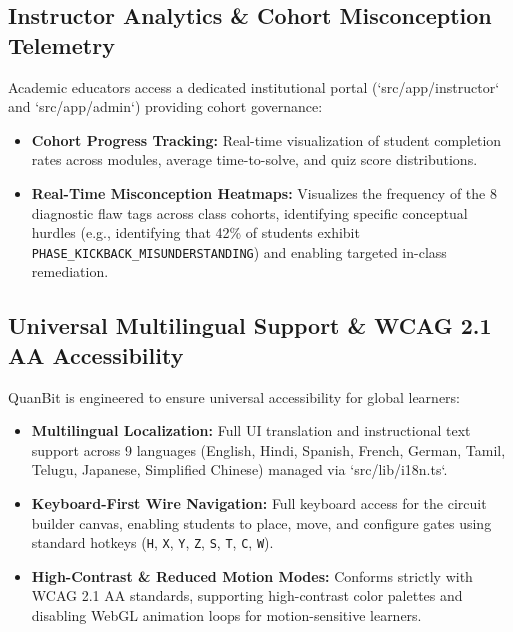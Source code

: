 \documentclass[11pt, a4paper]{article}
\begin{document}
\subsection{Instructor Analytics & Cohort Misconception Telemetry}
Academic educators access a dedicated institutional portal (`src/app/instructor` and `src/app/admin`) providing cohort governance:
\begin{itemize}
	\item \textbf{Cohort Progress Tracking:} Real-time visualization of student completion rates across modules, average time-to-solve, and quiz score distributions.
	\item \textbf{Real-Time Misconception Heatmaps:} Visualizes the frequency of the 8 diagnostic flaw tags across class cohorts, identifying specific conceptual hurdles (e.g., identifying that 42\% of students exhibit \texttt{PHASE\_KICKBACK\_MISUNDERSTANDING}) and enabling targeted in-class remediation.
\end{itemize}

\subsection{Universal Multilingual Support & WCAG 2.1 AA Accessibility}
QuanBit is engineered to ensure universal accessibility for global learners:
\begin{itemize}
	\item \textbf{Multilingual Localization:} Full UI translation and instructional text support across 9 languages (English, Hindi, Spanish, French, German, Tamil, Telugu, Japanese, Simplified Chinese) managed via `src/lib/i18n.ts`.
	\item \textbf{Keyboard-First Wire Navigation:} Full keyboard access for the circuit builder canvas, enabling students to place, move, and configure gates using standard hotkeys (\texttt{H}, \texttt{X}, \texttt{Y}, \texttt{Z}, \texttt{S}, \texttt{T}, \texttt{C}, \texttt{W}).
	\item \textbf{High-Contrast \& Reduced Motion Modes:} Conforms strictly with WCAG 2.1 AA standards, supporting high-contrast color palettes and disabling WebGL animation loops for motion-sensitive learners.
\end{itemize}

\newpage

\end{document}

